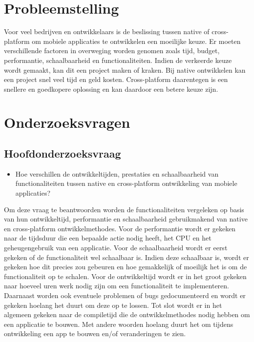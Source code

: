 \section{Probleemstelling}%
\label{sec:probleemstelling}

Voor veel bedrijven en ontwikkelaars is de beslissing tussen native of cross-platform om mobiele applicaties te ontwikkelen een moeilijke keuze. 
Er moeten verschillende factoren in overweging worden genomen zoals tijd, budget, performantie, schaalbaarheid en functionaliteiten. 
Indien de verkeerde keuze wordt gemaakt, kan dit een project maken of kraken. Bij native ontwikkelen kan een project snel veel tijd en geld kosten. 
Cross-platform daarentegen is een snellere en goedkopere oplossing en kan daardoor een betere keuze zijn.

\section{Onderzoeksvragen}%
\label{sec:onderzoeksvraag}

\subsection{Hoofdonderzoeksvraag}
\begin{itemize}
    \item Hoe verschillen de ontwikkeltijden, prestaties en schaalbaarheid van functionaliteiten tussen native en cross-platform ontwikkeling van mobiele applicaties?
\end{itemize}
Om deze vraag te beantwoorden worden de functionaliteiten vergeleken op basis van hun ontwikkeltijd, 
performantie en schaalbaarheid gebruikmakend van native en cross-platform ontwikkelmethodes. 
Voor de performantie wordt er gekeken naar de tijdsduur die een bepaalde actie nodig heeft, het CPU en het geheugengebruik van een applicatie.
Voor de schaalbaarheid wordt er eerst gekeken of de functionaliteit wel schaalbaar is. 
Indien deze schaalbaar is, wordt er gekeken hoe dit precies zou gebeuren en hoe gemakkelijk of moeilijk het is om de functionaliteit op te schalen. 
Voor de ontwikkeltijd wordt er in het groot gekeken naar hoeveel uren werk nodig zijn om een functionaliteit te implementeren. 
Daarnaast worden ook eventuele problemen of bugs gedocumenteerd en wordt er gekeken hoelang het duurt om deze op te lossen. 
Tot slot wordt er in het algemeen gekeken naar de compiletijd die de ontwikkelmethodes nodig hebben om een applicatie te bouwen.
Met andere woorden hoelang duurt het om tijdens ontwikkeling een app te bouwen en/of veranderingen te zien.

